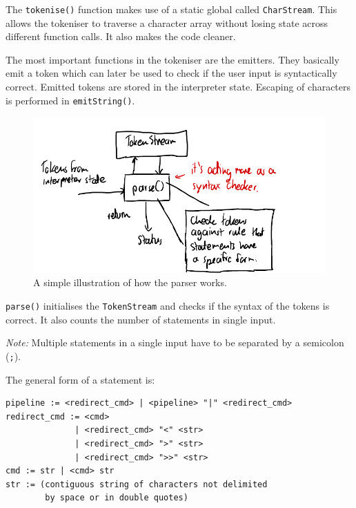 \documentclass[12pt]{article}
\begin{document}


The \texttt{tokenise()} function makes use of a static global
called \texttt{CharStream}. This allows the tokeniser to
traverse a character array without losing state across different
function calls. It also makes the code cleaner.

\newpage



The most important functions in the tokeniser are the emitters.
They basically emit a token which can later be used to check if
the user input is syntactically correct. Emitted tokens are
stored in the interpreter state. Escaping of characters is
performed in \texttt{emitString()}.

\begin{figure}[H]
\centering
\includegraphics{parser}
\caption{A simple illustration of how the parser works.}
\end{figure}

\newpage



\texttt{parse()} initialises the \texttt{TokenStream} and checks
if the syntax of the tokens is correct. It also counts the
number of statements in single input.

\textit{Note:} Multiple statements in a single input have to
be separated by a semicolon (\texttt{;}).

The general form of a statement is:

\begin{verbatim}
pipeline := <redirect_cmd> | <pipeline> "|" <redirect_cmd>
redirect_cmd := <cmd>
              | <redirect_cmd> "<" <str>
              | <redirect_cmd> ">" <str>
              | <redirect_cmd> ">>" <str> 
cmd := str | <cmd> str
str := (contiguous string of characters not delimited
        by space or in double quotes)
\end{verbatim}
\end{document}
